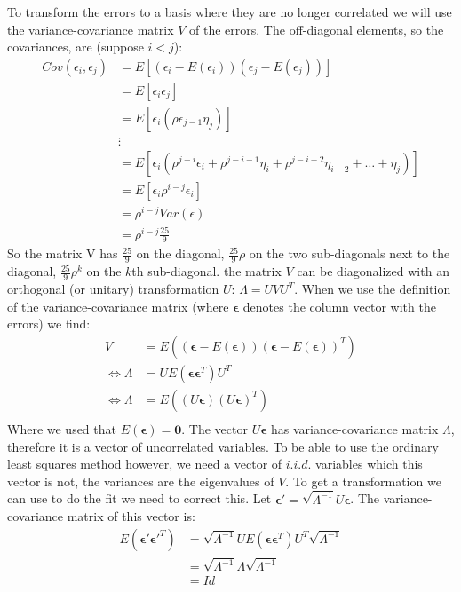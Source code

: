 \documentclass[a4paper]{article}
\begin{document}
To transform the errors to a basis where they are no longer correlated we will use the variance-covariance matrix $V$ of the errors. 
The off-diagonal elements, so the covariances, are (suppose $i < j$):
\begin{align*}
	Cov(\epsilon_i, \epsilon_j) &= E[(\epsilon_i-E(\epsilon_i))(\epsilon_j-E(\epsilon_j))]\\
				    &= E[\epsilon_i \epsilon_j]\\
				    &= E[\epsilon_i (\rho\epsilon_{j-1} \eta_j)]\\
				    &\vdots\\
				    &= E[\epsilon_i (\rho^{j-i} \epsilon_i + \rho^{j-i-1}\eta_i + \rho^{j-i-2}\eta_{i-2} + \ldots + \eta_j)]\\
				    &= E[\epsilon_i \rho^{i-j} \epsilon_i]\\
				    &= \rho^{i-j} Var(\epsilon)\\
				    &= \rho^{i-j} \frac{25}{9}
\end{align*}
So the matrix V has $ \frac{25}{9}$ on the diagonal, $ \frac{25}{9}\rho $ on the two sub-diagonals next to the diagonal, $ \frac{25}{9} \rho^k$ on the $k$th sub-diagonal.
the matrix $V$ can be diagonalized with an orthogonal (or unitary) transformation $U$: $\Lambda = UVU^T$. When we use the definition of the variance-covariance matrix (where $\mathbf{\epsilon}$ denotes the column vector with the errors) we find:
\begin{align*}
	V &= E( (\mathbf{\epsilon} - E(\mathbf{\epsilon})) (\mathbf{\epsilon} - E(\mathbf{\epsilon}))^T)\\
	\Leftrightarrow \Lambda &= U E( \mathbf{\epsilon} \mathbf{\epsilon}^T) U^T\\
	\Leftrightarrow \Lambda &= E( (U\mathbf{\epsilon})(U\mathbf{\epsilon})^T)\\
\end{align*}
Where we used that $E(\mathbf{\epsilon}) = \mathbf{0}$. The vector $U \mathbf{\epsilon}$ has variance-covariance matrix $\Lambda$, therefore it is a vector of uncorrelated variables. 
To be able to use the ordinary least squares method however, we need a vector of $i.i.d.$ variables which this vector is not, the variances are the eigenvalues of $V$. To get a transformation we can use to do the fit we need to correct this. Let $\mathbf{\epsilon}' = \sqrt{\Lambda^{-1}} U \mathbf{\epsilon}$. 
The variance-covariance matrix of this vector is:
\begin{align*}
	E(\mathbf{\epsilon}'\mathbf{\epsilon}'^T) &= \sqrt{\Lambda^{-1}} U E(\mathbf{\epsilon}\mathbf{\epsilon}^T) U^T \sqrt{\Lambda^{-1}}\\
						  &= \sqrt{\Lambda^{-1}} \Lambda \sqrt{\Lambda^{-1}}\\
						  &= Id
\end{align*}
\end{document}
